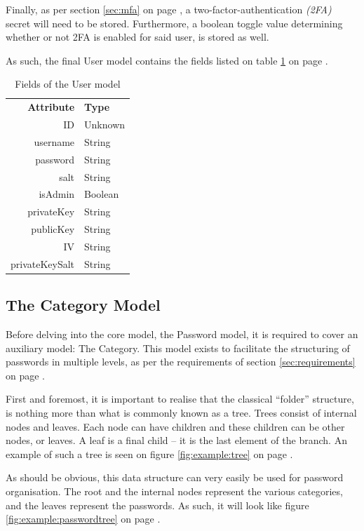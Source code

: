 			Finally, as per section \ref{sec:mfa} on page \pageref{sec:mfa}, a two-factor-authentication \emph{(2FA)} secret will need to be stored. Furthermore, a boolean toggle value determining whether or not 2FA is enabled for said user, is stored as well.

			As such, the final User model contains the fields listed on table \ref{fig:model:user} on page \pageref{fig:model:user}.

			\begin{table}[p]
				\centering
				\begin{tabular}{r|l}
					\textbf{Attribute} 		& \textbf{Type} 		\\
					ID 						& Unknown 	\\
					username 				& String 	\\
					password 				& String 	\\
					salt 					& String 	\\
					isAdmin 				& Boolean 	\\
					privateKey  			& String 	\\
					publicKey 				& String 	\\
					IV 						& String 	\\
					privateKeySalt 			& String 	\\
				\end{tabular}
				\caption{Fields of the User model}
				\label{fig:model:user}
			\end{table}

		\subsection{The Category Model}
			\label{sec:model:category}
			Before delving into the core model, the Password model, it is required to cover an auxiliary model: The Category. This model exists to facilitate the structuring of passwords in multiple levels, as per the requirements of section \ref{sec:requirements} on page \pageref{sec:requirements}.

			First and foremost, it is important to realise that the classical ``folder'' structure, is nothing more than what is commonly known as a tree. Trees consist of internal nodes and leaves. Each node can have children and these children can be other nodes, or leaves. A leaf is a final child -- it is the last element of the branch. An example of such a tree is seen on figure \ref{fig:example:tree} on page \pageref{fig:example:tree}.

			As should be obvious, this data structure can very easily be used for password organisation. The root and the internal nodes represent the various categories, and the leaves represent the passwords. As such, it will look like figure \ref{fig:example:passwordtree} on page \pageref{fig:example:passwordtree}.

